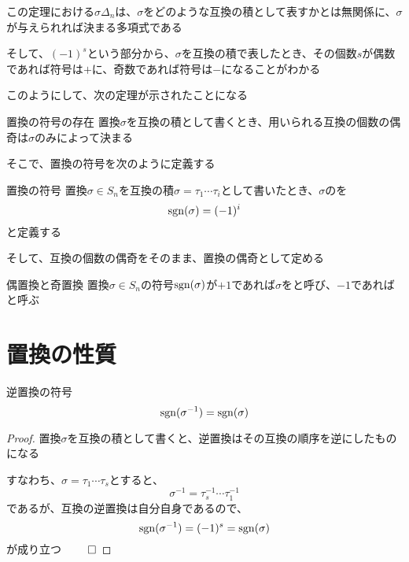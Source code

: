 \documentclass[../../../topic_linear-algebra]{subfiles}
\begin{document}
この定理における$\sigma\Delta_n$は、$\sigma$をどのような互換の積として表すかとは無関係に、$\sigma$が与えられれば決まる多項式である

\br

そして、$(-1)^s$という部分から、$\sigma$を互換の積で表したとき、その個数$s$が偶数であれば符号は$+$に、奇数であれば符号は$-$になることがわかる

\br

このようにして、次の定理が示されたことになる

\begin{theorem}{置換の符号の存在}
  置換$\sigma$を互換の積として書くとき、用いられる互換の個数の偶奇は$\sigma$のみによって決まる
\end{theorem}

そこで、置換の符号を次のように定義する

\begin{definition}{置換の符号}
  置換$\sigma \in S_n$を互換の積$\sigma = \tau_1 \cdots \tau_i$として書いたとき、$\sigma$のを
  \begin{equation*}
    \operatorname{sgn}(\sigma) = (-1)^i
  \end{equation*}
  と定義する
\end{definition}

そして、互換の個数の偶奇をそのまま、置換の偶奇として定める

\begin{definition}{偶置換と奇置換}
  置換$\sigma \in S_n$の符号$\operatorname{sgn}(\sigma)$が$+1$であれば$\sigma$をと呼び、$-1$であればと呼ぶ
\end{definition}

\sectionline
\section{置換の性質}

\begin{theorem}{逆置換の符号}\label{thm:sign-of-inverse-permutation}
  \begin{equation*}
    \operatorname{sgn}(\sigma^{-1}) = \operatorname{sgn}(\sigma)
  \end{equation*}
\end{theorem}

\begin{proof}
  置換$\sigma$を互換の積として書くと、逆置換はその互換の順序を逆にしたものになる

  すなわち、$\sigma = \tau_1 \cdots \tau_s$とすると、
  \begin{equation*}
    \sigma^{-1} = \tau_s^{-1} \cdots \tau_1^{-1}
  \end{equation*}
  であるが、互換の逆置換は自分自身であるので、
  \begin{equation*}
    \operatorname{sgn}(\sigma^{-1}) = (-1)^s = \operatorname{sgn}(\sigma)
  \end{equation*}
  が成り立つ $\qed$
\end{proof}
\end{document}
